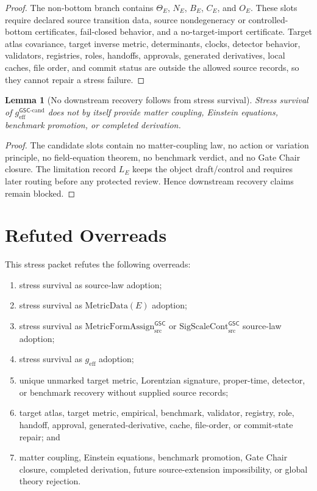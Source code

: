 \documentclass[11pt]{article}
\newcommand{\SigScaleCont}{\mathrm{SigScaleCont}^{\mathsf{GSC}}_{\mathrm{src}}}
\newcommand{\MetricFormAssign}{\mathrm{MetricFormAssign}^{\mathsf{GSC}}_{\mathrm{src}}}
\newcommand{\geff}{g_{\mathrm{eff}}}
\newcommand{\geffCand}{g_{\mathrm{eff}}^{\mathsf{GSC}\mbox{-}\mathrm{cand}}}
\newtheorem{lemma}{Lemma}
\begin{document}
\begin{proof}
The non-bottom branch contains \(\Theta_E\), \(N_E\), \(B_E\), \(C_E\), and
\(O_E\). These slots require declared source transition data, source
nondegeneracy or controlled-bottom certificates, fail-closed behavior, and a
no-target-import certificate. Target atlas covariance, target inverse metric,
determinants, clocks, detector behavior, validators, registries, roles,
handoffs, approvals, generated derivatives, local caches, file order, and
commit status are outside the allowed source records, so they cannot repair a
stress failure.
\end{proof}

\begin{lemma}[No downstream recovery follows from stress survival]
Stress survival of \(\geffCand\) does not by itself provide matter coupling,
Einstein equations, benchmark promotion, or completed derivation.
\end{lemma}

\begin{proof}
The candidate slots contain no matter-coupling law, no action or variation
principle, no field-equation theorem, no benchmark verdict, and no Gate Chair
closure. The limitation record \(L_E\) keeps the object draft/control and
requires later routing before any protected review. Hence downstream recovery
claims remain blocked.
\end{proof}

\section{Refuted Overreads}

This stress packet refutes the following overreads:
\begin{enumerate}[leftmargin=*]
  \item stress survival as source-law adoption;
  \item stress survival as \(\mathrm{MetricData}(E)\) adoption;
  \item stress survival as \(\MetricFormAssign\) or \(\SigScaleCont\)
  source-law adoption;
  \item stress survival as \(\geff\) adoption;
  \item unique unmarked target metric, Lorentzian signature, proper-time,
  detector, or benchmark recovery without supplied source records;
  \item target atlas, target metric, empirical, benchmark, validator,
  registry, role, handoff, approval, generated-derivative, cache, file-order,
  or commit-state repair; and
  \item matter coupling, Einstein equations, benchmark promotion, Gate Chair
  closure, completed derivation, future source-extension impossibility, or
  global theory rejection.
\end{enumerate}
\end{document}
